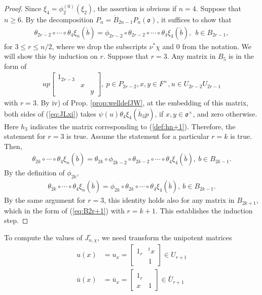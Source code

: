 \documentclass[11pt]{amsart}
\newcommand\oo{\mathfrak{o}}
\newcommand\1{\mathbf{1}}
\newcommand\ac{\acute}
\newcommand\tm{\times}
\newcommand\bu{\bar{u}}
\numberwithin{equation}{section}
\begin{document}
\begin{proof}
Since $\xi_4 = \phi_2^{(0)}(\xi_2)$, the assertion is obvious if $n = 4$.
Suppose that $n \ge 6$.
By the decomposition $P_{n} = \ac{B}_{2n-1} P_n(\oo)$, it suffices to show that
\begin{align}
\theta_{2r-2} \circ \cdots \circ \theta_4 \xi_n(\ac{b}) = \phi_{2r-2} \circ \theta_{2r-2} \circ \cdots \circ \theta_4 \xi_4(\ac{b}), \ \ b \in B_{2r-1}, \label{eq:JLxi}
\end{align} 
for $3 \le r \le n/2$, where we drop the subscripts $\nu^*\chi$ and $0$ from the notation.
We will show this by induction on $r$.
Suppose that $r =3$.
Any matrix in $B_5$ is in the form of 
\begin{align}
u p \begin{bmatrix}
1_{2r-3} &  &  \\
& x &  \\
& & y
\end{bmatrix}, \ p \in P_{2r-2}, x,y \in F^\tm, u \in U_{2r-2} U_{2r-1} \label{eq:B2r+1}
\end{align}
with $r = 3$.
By iv) of Prop. \ref{prop:welldefJW}, at the embedding of this matrix, both sides of (\ref{eq:JLxi}) takes $\psi(u)\theta_4 \xi_4(\ac{h}_{3}p)$, if $x,y \in \oo^\tm$, and zero otherwise.
Here $h_3$ indicates the matrix corresponding to (\ref{def:hn+1}).
Therefore, the statement for $r =3$ is true.
Assume the statement for a particular $r = k$ is true.
Then,  
\begin{align*}
\theta_{2k} \circ \cdots \circ \theta_4 \xi_n(\ac{b}) = \theta_{2k} \circ \phi_{2k-2} \circ \theta_{2k-2} \circ \cdots \circ \theta_4 \xi_4(\ac{b}), \ b \in B_{2k-1}.
\end{align*} 
By the definition of $\phi_{2k}$,  
\begin{align*}
\theta_{2k} \circ \cdots \circ \theta_4 \xi_n(\ac{b}) = \phi_{2k} \circ \theta_{2k} \circ \cdots \circ \theta_4 \xi_4(\ac{b}), \ b \in B_{2k-1}.
\end{align*} 
By the same argument for $r  =3$, this identity holds also for any matrix in $B_{2k+1}$, which in the form of (\ref{eq:B2r+1}) with $r = k+1$.
This establishes the induction step.
\end{proof}
To compute the values of $J_{n,\chi}^\circ$, we need transform the unipotent matrices
\begin{align*}
u(x) &= u_x = \begin{bmatrix}
1_{r} & {}^t x  \\
&1
\end{bmatrix} \in U_{r+1} \\ 
\bu(x) &= \bu_x = \begin{bmatrix}
1_{r} &   \\
x &1
\end{bmatrix} \in \bar{U}_{r+1} 
\end{align*} 
\end{document}
